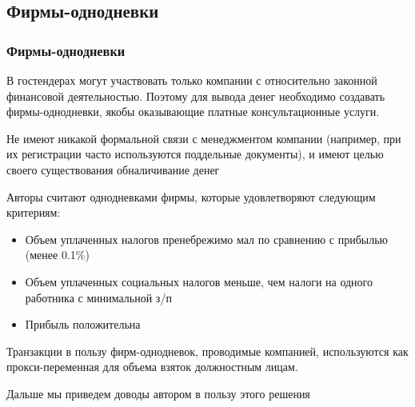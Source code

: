 \subsection{Фирмы-однодневки}

\begin{frame}

\frametitle{Фирмы-однодневки}
В гостендерах могут участвовать только компании с относительно законной финансовой деятельностью. Поэтому для вывода денег необходимо создавать фирмы-однодневки, якобы оказывающие платные консультационные услуги.
\vspace{3mm}

Не имеют никакой формальной связи с менеджментом компании (например, при их регистрации часто используются поддельные документы), и имеют целью своего существования обналичивание денег
\vspace{3mm}
\end{frame}


\begin{frame}
Авторы считают однодневками фирмы, которые удовлетворяют следующим критериям:
\begin{itemize}
\item Объем уплаченных налогов пренебрежимо мал по сравнению с прибылью (менее 0.1\%)
\item Объем уплаченных социальных налогов меньше, чем налоги на одного работника с минимальной з/п
\item Прибыль положительна
\end{itemize}
\vspace{3mm}

Транзакции в пользу фирм-однодневок, проводимые компанией, используются как прокси-переменная для объема взяток должностным лицам. 
\vspace{3mm}

Дальше мы приведем доводы автором в пользу этого решения

\end{frame}